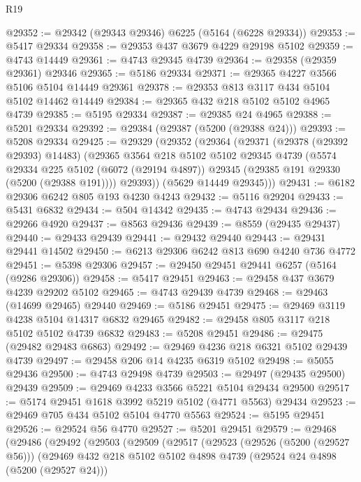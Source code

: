 \begin{lexlean}{R19}
\begin{coremodule}
{{{{{{{{{{{@29352 := @29342 (@29343 @29346) @6225 (@5164 (@6228 @29334))
@29353 := @5417 @29334
@29358 := @29353 @437 @3679 @4229 @29198 @5102
@29359 := @4743 @14449
@29361 := @4743 @29345 @4739
@29364 := @29358 (@29359 @29361) @29346
@29365 := @5186 @29334
@29371 := @29365 @4227 @3566 @5106 @5104 @14449 @29361
@29378 := @29353 @813 @3117 @434 @5104 @5102 @14462 @14449
@29384 := @29365 @432 @218 @5102 @5102 @4965 @4739
@29385 := @5195 @29334
@29387 := @29385 @24 @4965
@29388 := @5201 @29334
@29392 := @29384 (@29387 (@5200 (@29388 @24)))
@29393 := @5208 @29334
@29425 := @29329
    (@29352
      (@29364
        (@29371
          (@29378 (@29392 @29393) @14483)
          (@29365
            @3564
            @218
            @5102
            @5102
            @29345
            @4739
            (@5574
              @29334
              @225
              @5102
              (@6072 (@29194 @4897))
              @29345
              (@29385 @191 @29330 (@5200 (@29388 @191))))
            @29393))
        (@5629 @14449 @29345)))
@29431 := @6182 @29306 @6242 @805 @193 @4230 @4243
@29432 := @5116 @29204
@29433 := @5431 @6832
@29434 := @504 @14342
@29435 := @4743 @29434
@29436 := @29266 @4920
@29437 := @8563 @29436
@29439 := @8559 (@29435 @29437)
@29440 := @29433 @29439
@29441 := @29432 @29440
@29443 := @29431 @29441 @14502
@29450 := @6213 @29306 @6242 @813 @690 @4240 @736 @4772
@29451 := @5398 @29306
@29457 := @29450 @29451 @29441 @6257 (@5164 (@9286 @29306))
@29458 := @5417 @29451
@29463 := @29458 @437 @3679 @4239 @29202 @5102
@29465 := @4743 @29439 @4739
@29468 := @29463 (@14699 @29465) @29440
@29469 := @5186 @29451
@29475 := @29469 @3119 @4238 @5104 @14317 @6832 @29465
@29482 := @29458 @805 @3117 @218 @5102 @5102 @4739 @6832
@29483 := @5208 @29451
@29486 := @29475 (@29482 @29483 @6863)
@29492 := @29469 @4236 @218 @6321 @5102 @29439 @4739
@29497 := @29458 @206 @14 @4235 @6319 @5102
@29498 := @5055 @29436
@29500 := @4743 @29498 @4739
@29503 := @29497 (@29435 @29500) @29439
@29509 := @29469 @4233 @3566 @5221 @5104 @29434 @29500
@29517 := @5174 @29451 @1618 @3992 @5219 @5102 (@4771 @5563) @29434
@29523 := @29469 @705 @434 @5102 @5104 @4770 @5563
@29524 := @5195 @29451
@29526 := @29524 @56 @4770
@29527 := @5201 @29451
@29579 := @29468
    (@29486
      (@29492
        (@29503
          (@29509
            (@29517
              (@29523
                (@29526 (@5200 (@29527 @56)))
                (@29469
                  @432
                  @218
                  @5102
                  @5102
                  @4898
                  @4739
                  (@29524 @24 @4898 (@5200 (@29527 @24)))
}}}}}}}}}}}
\end{coremodule}
\end{lexlean}
